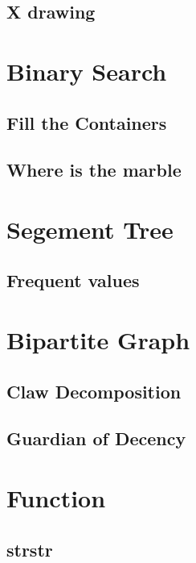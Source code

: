         \subsection{X drawing}
                

\section{Binary Search}
        \subsection{Fill the Containers}
                
        \subsection{Where is the marble}
                

\section{Segement Tree}
        \subsection{Frequent values}
                

\section{Bipartite Graph}
        \subsection{Claw Decomposition}
                
        \subsection{Guardian of Decency}
                

\section{Function}
        \subsection{strstr}
                
